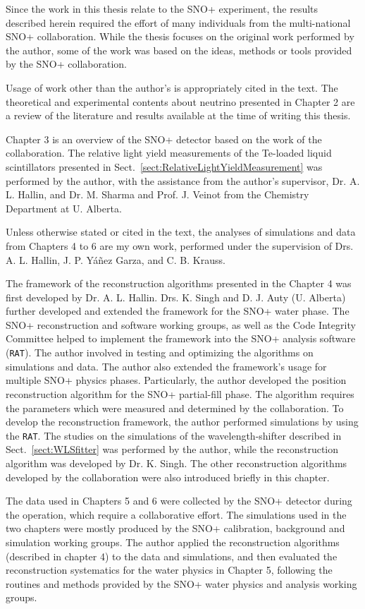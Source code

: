 Since the work in this thesis relate to the SNO+ experiment, the results described herein required the effort of many individuals from the multi-national SNO+ collaboration. While the thesis focuses on the original work performed by the author, some of the work was based on the ideas, methods or tools provided by the SNO+ collaboration.

Usage of work other than the author's is appropriately cited in the text. The theoretical and experimental contents about neutrino presented in Chapter 2 are a review of the literature and results available at the time of writing this thesis.

Chapter 3 is an overview of the SNO+ detector based on the work of the collaboration. The relative light yield measurements of the Te-loaded liquid scintillators presented in Sect.~\ref{sect:RelativeLightYieldMeasurement} was performed by the author, with the assistance from the author's supervisor, Dr. A. L. Hallin, and Dr. M. Sharma and Prof. J. Veinot from the Chemistry Department at U. Alberta.

Unless otherwise stated or cited in the text, the analyses of simulations and data from Chapters 4 to 6 are my own work, performed under the supervision of Drs. A. L. Hallin, J. P. Y\'{a}\~{n}ez Garza, and C. B. Krauss. 

The framework of the reconstruction algorithms presented in the Chapter 4 was first developed by Dr. A. L. Hallin. Drs. K. Singh and D. J. Auty (U. Alberta) further developed and extended the framework for the SNO+ water phase. The SNO+ reconstruction and software working groups, as well as the Code Integrity Committee helped to implement the framework into the SNO+ analysis software (\texttt{RAT}). The author involved in testing and optimizing the algorithms on simulations and data. The author also extended the framework's usage for multiple SNO+ physics phases. Particularly, the author developed the position reconstruction algorithm for the SNO+ partial-fill phase. The algorithm requires the parameters which were measured and determined by the collaboration. To develop the reconstruction framework, the author performed simulations by using the \texttt{RAT}. The studies on the simulations of the wavelength-shifter described in Sect.~\ref{sect:WLSfitter} was performed by the author, while the reconstruction algorithm was developed by Dr. K. Singh. The other reconstruction algorithms developed by the collaboration were also introduced briefly in this chapter. 

The data used in Chapters 5 and 6 were collected by the SNO+ detector during the operation, which require a collaborative effort. The simulations used in the two chapters were mostly produced by the SNO+ calibration, background and simulation working groups. The author applied the reconstruction algorithms (described in chapter 4) to the data and simulations, and then evaluated the reconstruction systematics for the water physics in Chapter 5, following the routines and methods provided by the SNO+ water physics and analysis working groups.

